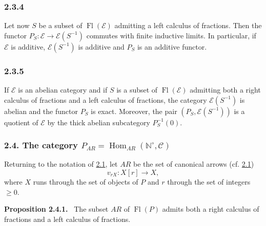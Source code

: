 \documentclass[11pt]{article}
\providecommand{\NN}{\mathbb{N}}
\newenvironment{statement}[1]{\par\medskip\noindent\textbf{#1.}\ }{\par\medskip}
\DeclareMathOperator{\Hom}{Hom}
\providecommand{\Hom}{\operatorname{Hom}}
\providecommand{\Fl}{\operatorname{Fl}}
\providecommand{\NN}{\mathbb N}
\providecommand{\cC}{\mathcal C}
\providecommand{\cE}{\mathcal E}
\providecommand{\cC}{\mathcal C}
\providecommand{\Hom}{\operatorname{Hom}}
\begin{document}
\subsubsection*{2.3.4}\label{sga5:V:subsubsection:2.3.4}
Let now $S$ be a subset of $\Fl(\cE)$ admitting a left calculus of fractions. Then the functor $P_S:\cE\to\cE(S^{-1})$ commutes with finite inductive limits. In particular, if $\cE$ is additive, $\cE(S^{-1})$ is additive and $P_S$ is an additive functor.

\subsubsection*{2.3.5}\label{sga5:V:subsubsection:2.3.5}
If $\cE$ is an abelian category and if $S$ is a subset of $\Fl(\cE)$ admitting both a right calculus of fractions and a left calculus of fractions, the category $\cE(S^{-1})$ is abelian and the functor $P_S$ is exact. Moreover, the pair $(P_S,\cE(S^{-1}))$ is a quotient of $\cE$ by the thick abelian subcategory $P_S^{-1}(0)$.

\subsubsection*{2.4. The category $P_{AR}=\Hom_{AR}(\NN^\circ,\cC)$}\label{sga5:V:subsubsection:2.4}
Returning to the notation of \hyperref[sga5:V:subsubsection:2.1]{2.1}, let $AR$ be the set of canonical arrows (cf. \hyperref[sga5:V:subsubsection:2.1]{2.1})
\[
v_{rX}:X[r]\longrightarrow X,
\]
where $X$ runs through the set of objects of $P$ and $r$ through the set of integers $\ge0$.

\label{sga5:V:proposition:2.4.1}\begin{statement}{Proposition 2.4.1}
The subset $AR$ of $\Fl(P)$ admits both a right calculus of fractions and a left calculus of fractions.
\end{statement}
\end{document}
